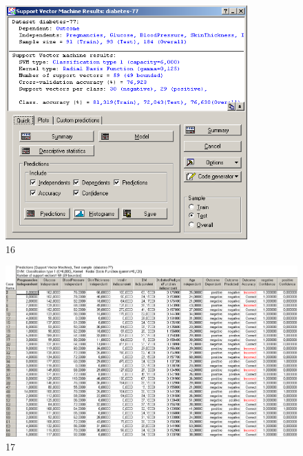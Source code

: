 \begin{figure}[!h]
  \centering

  \includegraphics[height=9cm]
  {inc/v5_16.PNG}

  \caption{16}

  \label{fig:v5_16}
\end{figure}

\begin{figure}[!hp]
  \centering

  \includegraphics[width=14cm]
  {inc/v5_17.PNG}

  \caption{17}

  \label{fig:v5_17}
\end{figure}

